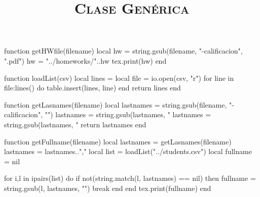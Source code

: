 \begin{luacode*}
    function getHWfile(filename)
        local hw = string.gsub(filename, "-calificacion", ".pdf")
        hw = "../homeworks/"..hw
        tex.print(hw)
    end

    function loadList(csv)
        local lines = {}
        local file = io.open(csv, "r")
        for line in file:lines() do
            table.insert(lines, line)
        end
        return lines
    end
        
    function getLasnames(filename)
       local lastnames = string.gsub(filename, "-calificacion", "") 
       lastnames = string.gsub(lastnames, "%
       lastnames = string.gsub(lastnames, "%
       return lastnames
    end

    function getFullname(filename)
       local lastnames = getLasnames(filename)
       lastnames = lastnames..","
       local list = loadList("../students.csv") 
       local fullname = nil

       for i,l in ipairs(list) do
            if not(string.match(l, lastnames) == nil) then
                fullname = string.gsub(l, lastnames, "")
                break
            end
        end
       tex.print(fullname)
    end

\end{luacode*}

\title{\Large{\textsc{Clase Genérica}} \\ \LARGE{\work}}
\author{\fullname}
